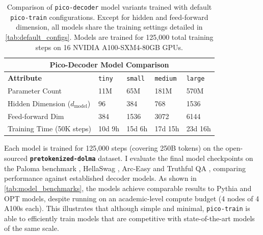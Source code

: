 \begin{table}[h!]
    \centering
    \renewcommand{\arraystretch}{1.2}
    \begin{tabular}{|p{}||p{}|p{}|p{}|p{}|}
    \hline
    \multicolumn{5}{|c|}{\textbf{Pico-Decoder Model Comparison}} \\
    \hline
    \textbf{Attribute} & \texttt{tiny} & \texttt{small} & \texttt{medium} & \texttt{large} \\
    \hline
    Parameter Count & 11M & 65M & 181M & 570M \\
    Hidden Dimension ($d_{\text{model}}$) & 96 & 384 & 768 & 1536 \\
    Feed-forward Dim & 384 & 1536 & 3072 & 6144 \\
    Training Time (50K steps) & 10d 9h & 15d 6h & 17d 15h & 23d 16h \\
    \hline
    \end{tabular}
    \vspace{0.5em}
    \caption{Comparison of \texttt{pico-decoder} model variants trained with default \texttt{pico-train} configurations. Except for hidden and feed-forward dimension, all models share the training settings detailed in \cref{tab:default_configs}. Models are trained for 125,000 total training steps on 16 NVIDIA A100-SXM4-80GB GPUs.}
    \label{tab:pico-decoder-configs}
    \end{table}

Each model is trained for 125,000 steps (covering 250B tokens) on the open-sourced \textbf{\texttt{pretokenized-dolma}} dataset. I evaluate the final model checkpoints on the Paloma benchmark \citep{magnusson2024paloma}, HellaSwag \citep{zellers2019hellaswag}, Arc-Easy \citep{clark2018arc} and Truthful QA \citep{lin2022truthfulqa}, comparing performance against established decoder models. As shown in \cref{tab:model_benchmarks}, the models achieve comparable results to Pythia and OPT models, despite running on an academic-level compute budget (4 nodes of 4 A100s each). This illustrates that although simple and minimal, \texttt{pico-train} is able to efficiently train models that are competitive with state-of-the-art models of the same scale.

